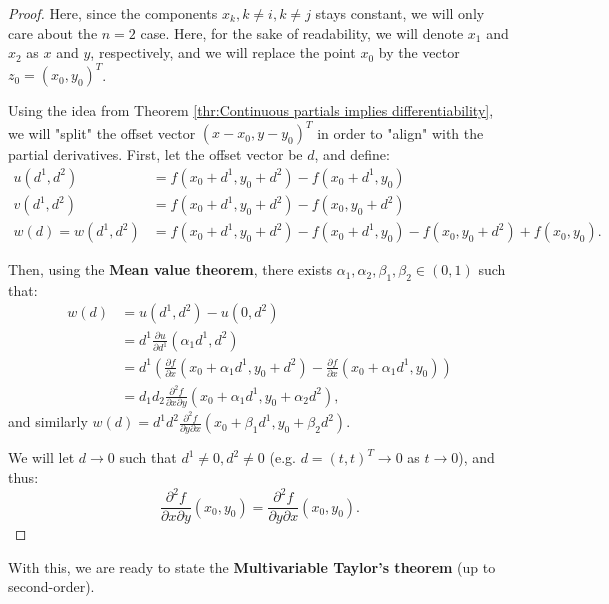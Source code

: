 \begin{proof}
  Here, since the components \( x_{k}, k\neq i, k\neq j \) stays constant, we
  will only care about the \( n = 2 \) case. Here, for the sake of
  readability, we will denote \( x_{1} \) and \( x_{2} \) as \( x \) and \( y
  \), respectively, and we will replace the point \( x_{0} \) by the vector \(
  z_{0} = (x_{0}, y_{0})^{T} \).

  Using the idea from Theorem \ref{thr:Continuous partials implies
  differentiability}, we will "split" the offset vector \( (x-x_{0},y-y_{0})^{T}
  \) in order to "align" with the partial derivatives. First, let the offset
  vector be \( d \), and define:
  \begin{align*}
    u(d^{1}, d^{2}) &= f(x_{0} + d^{1}, y_{0} + d^{2}) - f(x_{0} + d^{1}, y_{0})\\
    v(d^{1}, d^{2}) &= f(x_{0} + d^{1}, y_{0} + d^{2}) - f(x_{0}, y_{0} + d^{2}) \\
    w(d) = w(d^{1}, d^{2}) &= f(x_{0}+d^{1}, y_{0} + d^{2}) - f(x_{0} + d^{1}, y_{0}) -f(x_{0},
    y_{0} + d^{2}) +f(x_{0}, y_{0})
  .\end{align*}

  Then, using the \textbf{Mean value theorem}, there exists \( \alpha_{1},
  \alpha_{2}, \beta_{1}, \beta_{2} \in (0, 1) \) such that:
  \begin{align*}
    w(d) &= u(d^{1}, d^{2}) - u(0, d^{2}) \\
    &= d^{1} \frac{\partial u}{\partial d^{1}}(\alpha_{1}d^{1}, d^{2}) \\
    &= d^{1} \left( \frac{\partial f}{\partial x}(x_{0} + \alpha_{1}d^{1}, y_{0}
    + d^{2}) - \frac{\partial f}{\partial x}(x_{0} + \alpha_{1}d^{1}, y_{0})
  \right)\\
    &= d_{1}d_{2} \frac{\partial ^2 f}{\partial x \partial y}(x_{0} +
    \alpha_{1}d^{1}, y_{0}+\alpha_{2}d^{2})
  ,\end{align*} and similarly \( w(d) = d^{1}d^{2} \frac{\partial ^2 f}{\partial
  y\partial x}(x_{0}+\beta_{1}d^{1}, y_{0}+\beta_{2}d^{2}) \).

  We will let \( d \to 0 \) such that \( d^{1} \neq 0, d^{2} \neq 0 \) (e.g. \(
  d = (t, t)^{T} \to 0\) as \( t \to 0 \)), and thus:
  \[
    \frac{\partial ^2 f}{\partial x \partial y}(x_{0}, y_{0})=
    \frac{\partial ^2 f}{\partial y \partial x}(x_{0}, y_{0})
  .\] 
\end{proof}

With this, we are ready to state the \textbf{Multivariable Taylor's theorem} (up
to second-order).


